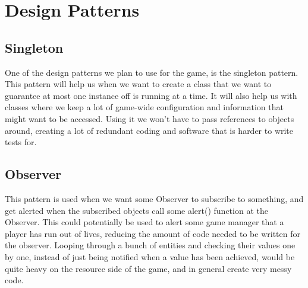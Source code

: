 \section{Design Patterns}

\subsection{Singleton}
One of the design patterns we plan to use for the game, is the singleton pattern. This pattern will help us when we want to create a class that we want to guarantee at most one instance off is running at a time. It will also help us with classes where we keep a lot of game-wide configuration and information that might want to be accessed. Using it we won't have to pass references to objects around, creating a lot of redundant coding and software that is harder to write tests for.

\subsection{Observer}
This pattern is used when we want some Observer to subscribe to something, and get alerted when the subscribed objects call some alert() function at the Observer. This could potentially be used to alert some game manager that a player has run out of lives, reducing the amount of code needed to be written for the observer. Looping through a bunch of entities and checking their values one by one, instead of just being notified when a value has been achieved, would be quite heavy on the resource side of the game, and in general create very messy code.